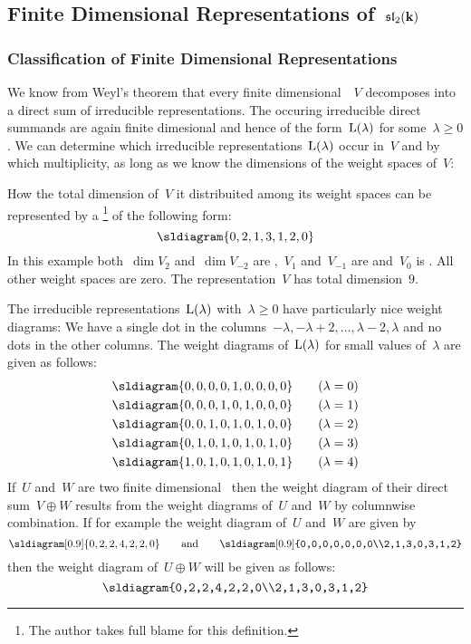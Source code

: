 \subsection{Finite Dimensional Representations of~\texorpdfstring{$\mathfrak{sl}_2(\mathbf{k})$}{sl2(k)}}



\subsubsection{Classification of Finite Dimensional Representations}


\begin{fluff}
  We know from Weyl’s theorem that every finite dimensional~{}~$V$ decomposes into a direct sum of irreducible representations.
  The occuring irreducible direct summands are again finite dimesional and hence of the form~$\operatorname{L}(\lambda)$ for some~$\lambda \geq 0$.
  We can determine which irreducible representations~$\operatorname{L}(\lambda)$ occur in~$V$ and by which multiplicity, as long as we know the dimensions of the weight spaces of~$V$:
  
  How the total dimension of~$V$ it distribuited among its weight spaces can be represented by a \footnote{The author takes full blame for this definition.} of the following form:
  \[
    \sldiagram{0,2,1,3,1,2,0}
  \]
  In this example both~$\dim V_2$ and~$\dim V_{-2}$ are {\twodimensional},~$V_1$ and~$V_{-1}$ are {\onedimensional} and~$V_0$ is {\threedimensional}.
  All other weight spaces are zero.
  The representation~$V$ has total dimension~$9$.
  
  The irreducible representations~$\operatorname{L}(\lambda)$ with~$\lambda \geq 0$ have particularly nice weight diagrams:
  We have a single dot in the columns~$-\lambda, -\lambda+2, \dotsc, \lambda-2, \lambda$ and no dots in the other columns.
  The weight diagrams of~$\operatorname{L}(\lambda)$ for small values of~$\lambda$ are given as follows:
  \begingroup
  \setlength{\jot}{5ex}
  \begin{gather*}
    \sldiagram{0,0,0,0,1,0,0,0,0}
    \tag{$\lambda=0$}
    \\
    \sldiagram{0,0,0,1,0,1,0,0,0}
    \tag{$\lambda=1$}
    \\
    \sldiagram{0,0,1,0,1,0,1,0,0}
    \tag{$\lambda=2$}
    \\
    \sldiagram{0,1,0,1,0,1,0,1,0}
    \tag{$\lambda=3$}
    \\
    \sldiagram{1,0,1,0,1,0,1,0,1}
    \tag{$\lambda=4$}
  \end{gather*}
  \endgroup
  If~$U$ and~$W$ are two finite dimensional~{} then the weight diagram of their direct sum~$V \oplus W$ results from the weight diagrams of~$U$ and~$W$ by columnwise combination.
  If for example the weight diagram of~$U$ and~$W$ are given by
  \[
    \sldiagram[0.9]{0,2,2,4,2,2,0}
    \qquad\text{and}\qquad
    \sldiagram[0.9]{0,0,0,0,0,0,0\\2,1,3,0,3,1,2}
  \]
  then the weight diagram of~$U \oplus W$ will be given as follows:
  \[
    \sldiagram{0,2,2,4,2,2,0\\2,1,3,0,3,1,2}
  \]
\end{fluff}


